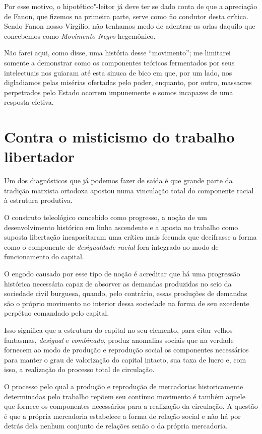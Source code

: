 Por esse motivo, o hipotético"-leitor já deve ter se dado conta de que a
apreciação de Fanon, que fizemos na primeira parte, serve como fio
condutor desta crítica. Sendo Fanon nosso Vírgílio, não tenhamos medo de
adentrar as orlas daquilo que concebemos como \emph{Movimento Negro}
hegemônico.

Não farei aqui, como disse, uma história desse ``movimento''; me
limitarei somente a demonstrar como os componentes teóricos fermentados
por seus intelectuais nos guiaram até esta sinuca de bico em que, por um
lado, nos digladiamos pelas misérias ofertadas pelo poder, enquanto, por
outro, massacres perpetrados pelo Estado ocorrem impunemente e somos
incapazes de uma resposta efetiva.

\chapter{Contra o misticismo do trabalho libertador}

Um dos diagnósticos que já
podemos fazer de saída é que grande parte da tradição marxista ortodoxa
apostou numa vinculação total do componente racial à estrutura
produtiva.

O construto teleológico concebido como progresso, a noção de um
desenvolvimento histórico em linha ascendente e a aposta no trabalho
como suposta libertação incapacitaram uma crítica mais fecunda que
decifrasse a forma como o componente de \emph{desigualdade racial} fora
integrado ao modo de funcionamento do capital.

O engodo causado por esse tipo de noção é acreditar que há uma
progressão histórica necessária capaz de absorver as demandas produzidas
no seio da sociedade civil burguesa, quando, pelo contrário, essas
produções de demandas são o próprio movimento no interior dessa
sociedade na forma de seu excedente perpétuo comandado pelo capital.

Isso significa que a estrutura do capital no seu elemento, para citar
velhos fantasmas, \emph{desigual} e \emph{combinado}, produz anomalias
sociais que na verdade fornecem ao modo de produção e reprodução social
os componentes necessários para manter o grau de valorização do capital
intacto, sua taxa de lucro e, com isso, a realização do processo total
de circulação.

O processo pelo qual a produção e reprodução de mercadorias
historicamente determinadas pelo trabalho repõem seu contínuo movimento
é também aquele que fornece os componentes necessários para a realização
da circulação. A questão é que a
própria mercadoria estabelece a forma de relação social e não há por
detrás dela nenhum conjunto de relações senão o da própria mercadoria.

